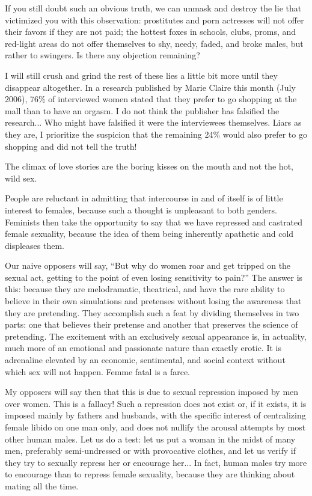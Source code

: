 \par If you still doubt such an obvious truth, we can unmask and destroy the lie that victimized you with this observation: prostitutes and porn actresses will not offer their favors if they are not paid; the hottest foxes in schools, clubs, proms, and red-light areas do not offer themselves to shy, needy, faded, and broke males, but rather to swingers. Is there any objection remaining?

\par I will still crush and grind the rest of these lies a little bit more until they disappear altogether. In a research published by Marie Claire this month (July 2006), 76\% of interviewed women stated that they prefer to go shopping at the mall than to have an orgasm. I do not think the publisher has falsified the research... Who might have falsified it were the interviewees themselves. Liars as they are, I prioritize the suspicion that the remaining 24\% would also prefer to go shopping and did not tell the truth!

\par The climax of love stories are the boring kisses on the mouth and not the hot, wild sex.

\par People are reluctant in admitting that intercourse in and of itself is of little interest to females, because such a thought is unpleasant to both genders. Feminists then take the opportunity to say that we have repressed and castrated female sexuality, because the idea of them being inherently apathetic and cold displeases them.

\par Our naive opposers will say, \enquote{But why do women roar and get tripped on the sexual act, getting to the point of even losing sensitivity to pain?} The answer is this: because they are melodramatic, theatrical, and have the rare ability to believe in their own simulations and pretenses without losing the awareness that they are pretending. They accomplish such a feat by dividing themselves in two parts: one that believes their pretense and another that preserves the science of pretending. The excitement with an exclusively sexual appearance is, in actuality, much more of an emotional and passionate nature than exactly erotic. It is adrenaline elevated by an economic, sentimental, and social context without which sex will not happen. Femme fatal is a farce.

\par My opposers will say then that this is due to sexual repression imposed by men over women. This is a fallacy! Such a repression does not exist or, if it exists, it is imposed mainly by fathers and husbands, with the specific interest of centralizing female libido on one man only, and does not nullify the arousal attempts by most other human males. Let us do a test: let us put a woman in the midst of many men, preferably semi-undressed or with provocative clothes, and let us verify if they try to sexually repress her or encourage her... In fact, human males try more to encourage than to repress female sexuality, because they are thinking about mating all the time.

